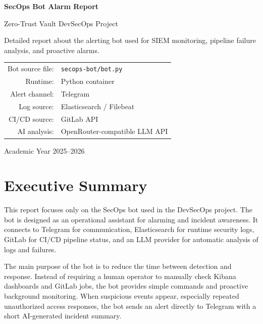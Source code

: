 \documentclass[12pt,a4paper]{report}
\begin{document}
\begin{titlepage}
    \centering
    \vspace*{1.5cm}
    {\Huge\bfseries SecOps Bot Alarm Report\par}
    \vspace{0.5cm}
    {\Large Zero-Trust Vault DevSecOps Project\par}
    \vspace{1cm}
    {\large Detailed report about the alerting bot used for SIEM monitoring, pipeline failure analysis, and proactive alarms.\par}
    \vfill
    \begin{tabular}{rl}
        Bot source file: & \texttt{secops-bot/bot.py} \\
        Runtime: & Python container \\
        Alert channel: & Telegram \\
        Log source: & Elasticsearch / Filebeat \\
        CI/CD source: & GitLab API \\
        AI analysis: & OpenRouter-compatible LLM API \\
    \end{tabular}
    \vfill
    {\large Academic Year 2025--2026\par}
\end{titlepage}

\tableofcontents
\listoffigures
\listoftables
\newpage
{}

\chapter*{Executive Summary}

This report focuses only on the SecOps bot used in the DevSecOps project. The bot is designed as an operational assistant for alarming and incident awareness. It connects to Telegram for communication, Elasticsearch for runtime security logs, GitLab for CI/CD pipeline status, and an LLM provider for automatic analysis of logs and failures.

The main purpose of the bot is to reduce the time between detection and response. Instead of requiring a human operator to manually check Kibana dashboards and GitLab jobs, the bot provides simple commands and proactive background monitoring. When suspicious events appear, especially repeated unauthorized access responses, the bot sends an alert directly to Telegram with a short AI-generated incident summary.
\end{document}
